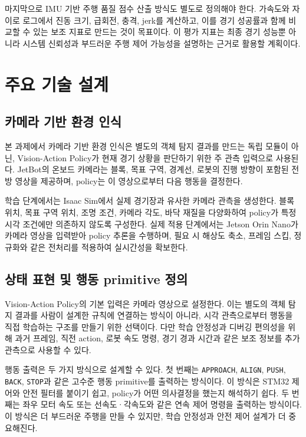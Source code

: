 \documentclass[titlepage]{pnureport}
\begin{document}
마지막으로 IMU 기반 주행 품질 점수 산출 방식도 별도로 정의해야 한다. 가속도와 자이로 로그에서 진동 크기, 급회전, 충격, jerk를 계산하고, 이를 경기 성공률과 함께 비교할 수 있는 보조 지표로 만드는 것이 목표이다. 이 평가 지표는 최종 경기 성능뿐 아니라 시스템 신뢰성과 부드러운 주행 제어 가능성을 설명하는 근거로 활용할 계획이다.

\chapter{주요 기술 설계}

\section{카메라 기반 환경 인식}

본 과제에서 카메라 기반 환경 인식은 별도의 객체 탐지 결과를 만드는 독립 모듈이 아닌, Vision-Action Policy가 현재 경기 상황을 판단하기 위한 주 관측 입력으로 사용된다. JetBot의 온보드 카메라는 블록, 목표 구역, 경계선, 로봇의 진행 방향이 포함된 전방 영상을 제공하며, policy는 이 영상으로부터 다음 행동을 결정한다.

학습 단계에서는 Isaac Sim에서 실제 경기장과 유사한 카메라 관측을 생성한다. 블록 위치, 목표 구역 위치, 조명 조건, 카메라 각도, 바닥 재질을 다양화하여 policy가 특정 시각 조건에만 의존하지 않도록 구성한다. 실제 적용 단계에서는 Jetson Orin Nano가 카메라 영상을 입력받아 policy 추론을 수행하며, 필요 시 해상도 축소, 프레임 스킵, 정규화와 같은 전처리를 적용하여 실시간성을 확보한다.

\section{상태 표현 및 행동 primitive 정의}

Vision-Action Policy의 기본 입력은 카메라 영상으로 설정한다. 이는 별도의 객체 탐지 결과를 사람이 설계한 규칙에 연결하는 방식이 아니라, 시각 관측으로부터 행동을 직접 학습하는 구조를 만들기 위한 선택이다. 다만 학습 안정성과 디버깅 편의성을 위해 과거 프레임, 직전 action, 로봇 속도 명령, 경기 경과 시간과 같은 보조 정보를 추가 관측으로 사용할 수 있다.

행동 출력은 두 가지 방식으로 설계할 수 있다. 첫 번째는 \texttt{APPROACH}, \texttt{ALIGN}, \texttt{PUSH}, \texttt{BACK}, \texttt{STOP}과 같은 고수준 행동 primitive를 출력하는 방식이다. 이 방식은 STM32 제어와 안전 필터를 붙이기 쉽고, policy가 어떤 의사결정을 했는지 해석하기 쉽다. 두 번째는 좌우 모터 속도 또는 선속도·각속도와 같은 연속 제어 명령을 출력하는 방식이다. 이 방식은 더 부드러운 주행을 만들 수 있지만, 학습 안정성과 안전 제어 설계가 더 중요해진다.
\end{document}
